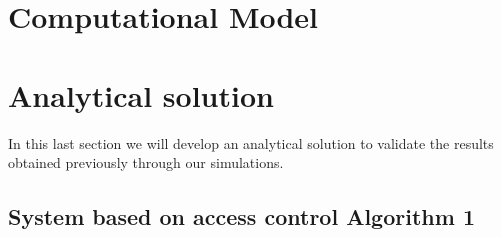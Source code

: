 \documentclass[10pt,a4paper]{article}
\begin{document}
\newpage
\section{Computational Model}








\newpage
\section{Analytical solution}

In this last section we will develop an analytical solution to validate the results obtained previously through our simulations. 

\subsection{System based on access control Algorithm 1}
\end{document}
